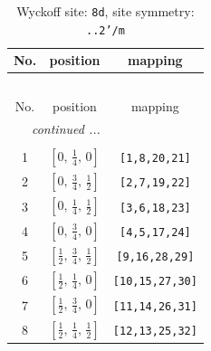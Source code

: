 \documentclass[fleqn,8pt]{jsarticle}
\begin{document}
\begin{longtable}{ccc}
\caption{Wyckoff site: {\tt 8d}, site symmetry: {\tt ..2'/m}}
 \\
 \hline \hline
No. & position & mapping \\ \hline \endfirsthead

\multicolumn{2}{l}{\tablename\ \thetable{}} \\
 \hline \hline
No. & position & mapping \\ \hline \endhead

 \hline \hline
\multicolumn{2}{r}{\footnotesize\it continued ...} \\ \endfoot

 \hline \hline
\multicolumn{2}{r}{} \\ \endlastfoot

1 & $\left[ 0,\, \frac{1}{4},\, 0 \right]$ & {\tt [1,8,20,21]} \\ \hline
2 & $\left[ 0,\, \frac{3}{4},\, \frac{1}{2} \right]$ & {\tt [2,7,19,22]} \\ \hline
3 & $\left[ 0,\, \frac{1}{4},\, \frac{1}{2} \right]$ & {\tt [3,6,18,23]} \\ \hline
4 & $\left[ 0,\, \frac{3}{4},\, 0 \right]$ & {\tt [4,5,17,24]} \\ \hline
5 & $\left[ \frac{1}{2},\, \frac{3}{4},\, \frac{1}{2} \right]$ & {\tt [9,16,28,29]} \\ \hline
6 & $\left[ \frac{1}{2},\, \frac{1}{4},\, 0 \right]$ & {\tt [10,15,27,30]} \\ \hline
7 & $\left[ \frac{1}{2},\, \frac{3}{4},\, 0 \right]$ & {\tt [11,14,26,31]} \\ \hline
8 & $\left[ \frac{1}{2},\, \frac{1}{4},\, \frac{1}{2} \right]$ & {\tt [12,13,25,32]} \\
\end{longtable}
\renewcommand{\arraystretch}{1.2}
\end{document}
